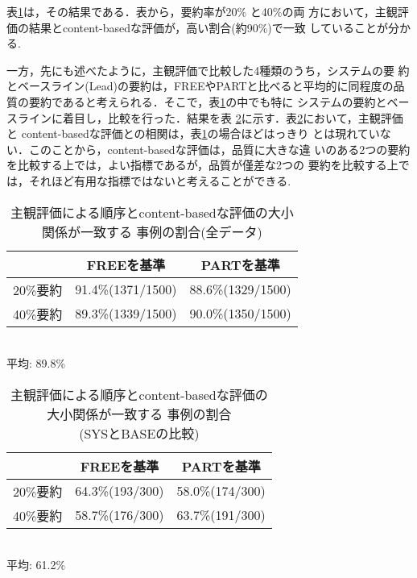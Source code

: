表\ref{table:cbcomp1}は，その結果である．表から，要約率が20\% と40\%の両
方において，主観評価の結果とcontent-basedな評価が，高い割合(約90\%)で一致
していることが分かる.

一方，先にも述べたように，主観評価で比較した4種類のうち，システムの要
約とベースライン(Lead)の要約は，FREEやPARTと比べると平均的に同程度の品
質の要約であると考えられる．そこで，表\ref{table:cbcomp1}の中でも特に
システムの要約とベースラインに着目し，比較を行った．結果を表
\ref{table:cbcomp2}に示す．表\ref{table:cbcomp2}において，主観評価と
content-basedな評価との相関は，表\ref{table:cbcomp1}の場合ほどはっきり
とは現れていない．このことから，content-basedな評価は，品質に大きな違
いのある2つの要約を比較する上では，よい指標であるが，品質が僅差な2つの
要約を比較する上では，それほど有用な指標ではないと考えることができる.

\begin{table}[t]
\caption{主観評価による順序とcontent-basedな評価の大小関係が一致する
 事例の割合(全データ)\label{table:cbcomp1}}
\begin{center}
\begin{tabular}{|c|c|c|}\hline
    & FREEを基準 & PARTを基準  \\ \hline\hline
20\%要約 & 91.4\%(1371/1500) & 88.6\%(1329/1500) \\ \hline
40\%要約 & 89.3\%(1339/1500) & 90.0\%(1350/1500) \\ \hline
\end{tabular}\\
\vspace{0.1cm}
平均: 89.8\%
\vspace{-0.7cm}
\end{center}
\end{table}


\begin{table}[t]
\caption{主観評価による順序とcontent-basedな評価の大小関係が一致する
 事例の割合\\
(SYSとBASEの比較)\label{table:cbcomp2}}
\begin{center}
\begin{tabular}{|c|c|c|}\hline
    & FREEを基準    & PARTを基準    \\ \hline\hline
20\%要約 & 64.3\%(193/300) & 58.0\%(174/300) \\ \hline
40\%要約 & 58.7\%(176/300) & 63.7\%(191/300) \\ \hline
\end{tabular}\\
\vspace{0.1cm}
平均: 61.2\%
\vspace{-0.7cm}
\end{center}
\end{table}

